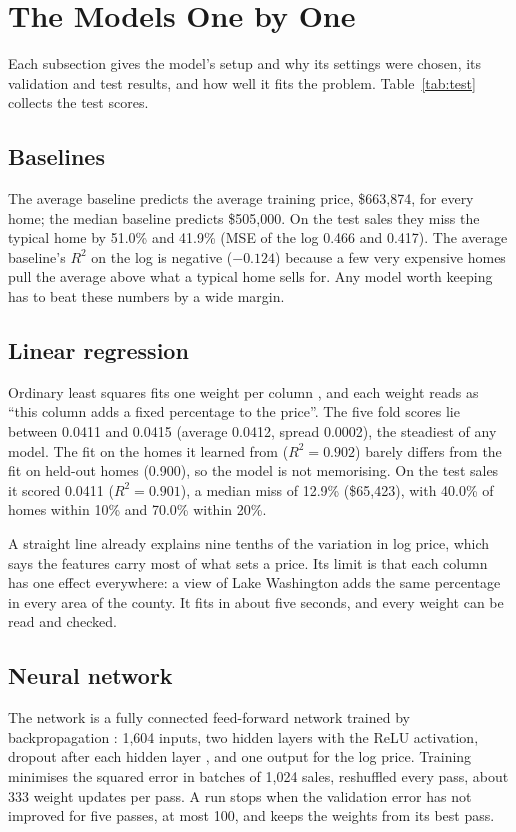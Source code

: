 \documentclass[sigconf,nonacm,10pt]{acmart}
\begin{document}
\section{The Models One by One}
\label{sec:models}

Each subsection gives the model's setup and why its settings were chosen, its validation and test results, and how well it fits the problem. Table~\ref{tab:test} collects the test scores.

\subsection{Baselines}
The average baseline predicts the average training price, \$663,874, for every home; the median baseline predicts \$505,000. On the test sales they miss the typical home by 51.0\% and 41.9\% (MSE of the log 0.466 and 0.417). The average baseline's $R^2$ on the log is negative ($-0.124$) because a few very expensive homes pull the average above what a typical home sells for. Any model worth keeping has to beat these numbers by a wide margin.

\subsection{Linear regression}
Ordinary least squares fits one weight per column \cite{hastie2009}, and each weight reads as ``this column adds a fixed percentage to the price''. The five fold scores lie between 0.0411 and 0.0415 (average 0.0412, spread 0.0002), the steadiest of any model. The fit on the homes it learned from ($R^2 = 0.902$) barely differs from the fit on held-out homes (0.900), so the model is not memorising. On the test sales it scored 0.0411 ($R^2 = 0.901$), a median miss of 12.9\% (\$65,423), with 40.0\% of homes within 10\% and 70.0\% within 20\%.

A straight line already explains nine tenths of the variation in log price, which says the features carry most of what sets a price. Its limit is that each column has one effect everywhere: a view of Lake Washington adds the same percentage in every area of the county. It fits in about five seconds, and every weight can be read and checked.

\subsection{Neural network}
The network is a fully connected feed-forward network trained by backpropagation \cite{rumelhart1986}: 1,604 inputs, two hidden layers with the ReLU activation, dropout after each hidden layer \cite{srivastava2014}, and one output for the log price. Training minimises the squared error in batches of 1,024 sales, reshuffled every pass, about 333 weight updates per pass. A run stops when the validation error has not improved for five passes, at most 100, and keeps the weights from its best pass.
\end{document}
